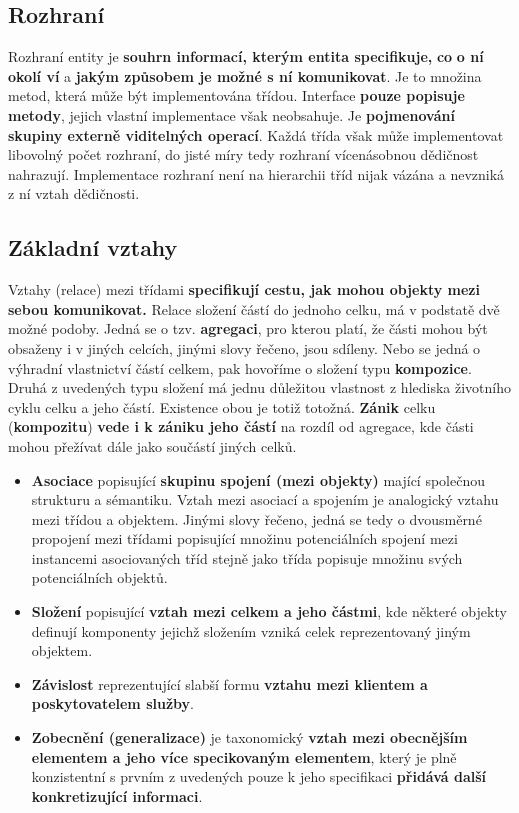 \subsection{Rozhraní}
Rozhraní entity je \textbf{souhrn informací, kterým entita specifikuje,} \textbf{co} \textbf{o ní okolí ví} a\textbf{ jakým způsobem je možné s ní komunikovat}. Je to množina metod, která může být implementována třídou. Interface \textbf{pouze popisuje metody}, jejich vlastní implementace však neobsahuje. Je \textbf{pojmenování skupiny externě viditelných operací}. Každá třída však může implementovat libovolný počet rozhraní, do jisté míry tedy rozhraní vícenásobnou dědičnost nahrazují. Implementace rozhraní není na hierarchii tříd nijak vázána a nevzniká z ní vztah dědičnosti.


\subsection{Základní vztahy}
Vztahy (relace) mezi třídami \textbf{specifikují cestu, jak mohou objekty mezi sebou komunikovat.} Relace složení částí do jednoho celku, má v podstatě dvě možné podoby.  Jedná se  o tzv. \textbf{agregaci}, pro kterou platí, že části mohou být obsaženy i v jiných celcích, jinými slovy řečeno, jsou sdíleny.  Nebo se jedná o výhradní vlastnictví částí celkem, pak hovoříme o  složení typu \textbf{kompozice}.  Druhá z uvedených typu složení má jednu důležitou vlastnost  z hlediska životního cyklu celku a jeho částí.  Existence obou je totiž totožná.  \textbf{Zánik} celku  (\textbf{kompozitu}) \textbf{vede i k zániku jeho částí} na rozdíl od agregace, kde části mohou přežívat dále jako součástí jiných celků.

\begin{itemize}
\item \textbf{Asociace} popisující\textbf{ skupinu spojení (mezi objekty)} mající společnou strukturu a sémantiku. Vztah mezi asociací a spojením je analogický vztahu mezi třídou a objektem. Jinými slovy řečeno, jedná se tedy o dvousměrné propojení mezi třídami popisující množinu potenciálních spojení mezi instancemi asociovaných tříd stejně jako třída popisuje množinu svých potenciálních objektů.
\item \textbf{Složení} popisující \textbf{vztah mezi celkem a jeho částmi}, kde některé objekty definují komponenty jejichž složením vzniká celek reprezentovaný jiným objektem.
\item \textbf{Závislost} reprezentující slabší formu \textbf{vztahu mezi klientem a poskytovatelem služby}.
\item \textbf{Zobecnění (generalizace)} je taxonomický \textbf{vztah mezi obecnějším elementem a jeho více specikovaným elementem}, který je plně konzistentní s prvním z uvedených pouze k jeho specifikaci \textbf{přidává další konkretizující informaci}.
\end{itemize}